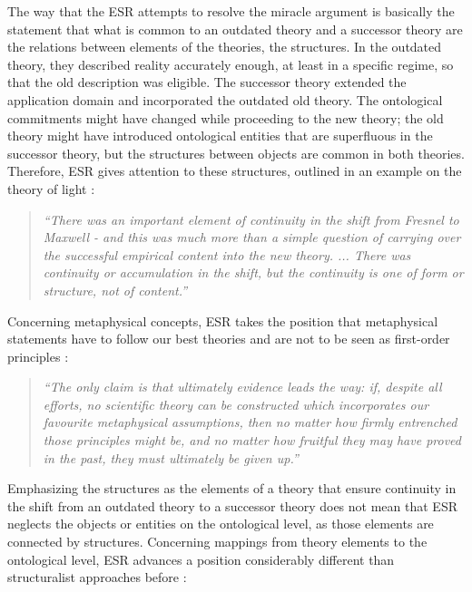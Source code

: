 \documentclass{article}
\begin{document}
The way that the ESR attempts to resolve the miracle argument is basically the statement that what is common to an outdated theory and a successor theory are the relations between elements of the theories, the structures. In the outdated theory, they described reality accurately enough, at least in a specific regime, so that the old description was eligible. The successor theory extended the application domain and incorporated the outdated old theory. The ontological commitments might have changed while proceeding to the new theory; the old theory might have introduced ontological entities that are superfluous in the successor theory, but the structures between objects are common in both theories. Therefore, ESR gives attention to these structures, outlined in an example on the theory of light \cite[p.117]{worrall1989structural}:

\begin{quote}
\textit{``There was an important element of continuity in the shift from Fresnel to Maxwell - and this was much more than a simple question of carrying over the successful empirical content into the new theory.
... There was continuity or accumulation in the shift, but the continuity is one of form or structure, not of content.''}
\end{quote}

Concerning metaphysical concepts, ESR takes the position that metaphysical statements have to follow our best theories and are not to be seen as first-order principles \cite[p.123]{worrall1989structural}:

\begin{quote}
\textit{``The only claim is that ultimately evidence leads the way: if, despite all efforts, no scientific theory can be constructed which incorporates our favourite metaphysical assumptions, then no matter how firmly entrenched those principles might be, and no matter how fruitful they may have proved in the past, they must ultimately be given up.''}
\end{quote}

Emphasizing the structures as the elements of a theory that ensure continuity in the shift from an outdated theory to a successor theory does not mean that ESR neglects the objects or entities on the ontological level, as those elements are connected by structures. Concerning mappings from theory elements to the ontological level, ESR advances a position considerably different than structuralist approaches before \cite[p.154]{worrall2007miracles}: 
\end{document}
